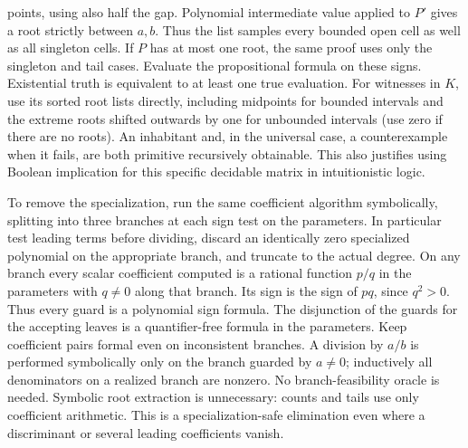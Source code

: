 points, using also half the gap. Polynomial intermediate value applied
to $P'$ gives a root strictly between $a,b$. Thus the list samples
every bounded open cell as well as all singleton cells. If $P$ has at
most one root, the same proof uses only the singleton and tail cases.
Evaluate the propositional formula on these signs. Existential truth is
equivalent to at least one true evaluation. For witnesses in $K$, use its
sorted root lists directly, including midpoints for bounded intervals and
the extreme roots shifted outwards by one for unbounded intervals
(use zero if there are no roots). An inhabitant and, in the universal
case, a counterexample when it fails, are both primitive recursively
obtainable. This also justifies using Boolean implication for this
specific decidable matrix in intuitionistic logic.

To remove the specialization, run the same coefficient algorithm
symbolically, splitting into three branches at each sign test on the
parameters. In particular test leading terms before dividing, discard
an identically zero specialized polynomial on the appropriate branch,
and truncate to the actual degree. On any branch every scalar coefficient
computed is a rational function $p/q$ in the parameters with $q\ne0$
along that branch. Its sign is the sign of $pq$, since $q^2>0$.
Thus every guard is a polynomial sign formula. The disjunction of the
guards for the accepting leaves is a quantifier-free formula in the
parameters. Keep coefficient pairs formal even on inconsistent branches. A division by $a/b$ is performed symbolically only on the branch guarded by $a\ne0$; inductively all denominators on a realized branch are nonzero. No branch-feasibility oracle is needed.
Symbolic root extraction is unnecessary: counts and tails use only
coefficient arithmetic. This is a specialization-safe elimination even
where a discriminant or several leading coefficients vanish.


